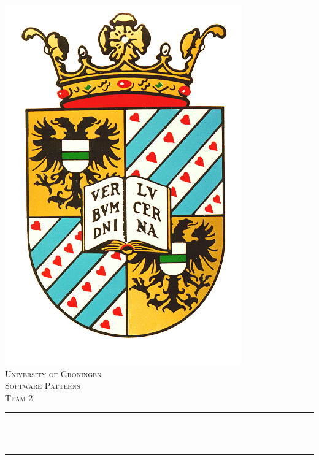 

\begin{titlepage}
	\centering
    
    \vspace*{0.5 cm}
    \includegraphics[scale = 0.25]{images/rug.png}\\[1.0 cm]	%
    \textsc{\LARGE University of Groningen}\\[0.3cm]
	\textsc{\large {Software Patterns}}\\
	\textsc{\large {Team 2}} \\[1.5 cm]
	\rule{\linewidth}{0.2 mm} \\[0.1 cm]
	{ \huge \bfseries \thetitle}\\
	
	\rule{\linewidth}{0.2 mm} \\[1.0 cm]


\end{titlepage}
